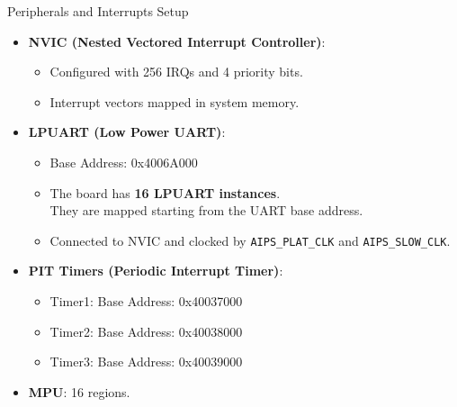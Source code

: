 \begin{frame}{Peripherals and Interrupts Setup}
    \begin{itemize}
        \item \textbf{NVIC (Nested Vectored Interrupt Controller)}:
        \begin{itemize}
            \item Configured with 256 IRQs and 4 priority bits.
            \item Interrupt vectors mapped in system memory.
        \end{itemize}
        \item \textbf{LPUART (Low Power UART)}:
        \begin{itemize}
            \item Base Address: 0x4006A000
            \item The board has \textbf{16 LPUART instances}.\\ They are mapped starting from the UART base address. 
            \item Connected to NVIC and clocked by \texttt{AIPS\_PLAT\_CLK} and \texttt{AIPS\_SLOW\_CLK}.
        \end{itemize}
        \item \textbf{PIT Timers (Periodic Interrupt Timer)}:
        \begin{itemize}
            \item Timer1: Base Address: 0x40037000
            \item Timer2: Base Address: 0x40038000
            \item Timer3: Base Address: 0x40039000
        \end{itemize}
        \item \textbf{MPU}: 16 regions.
    \end{itemize}
\end{frame}

